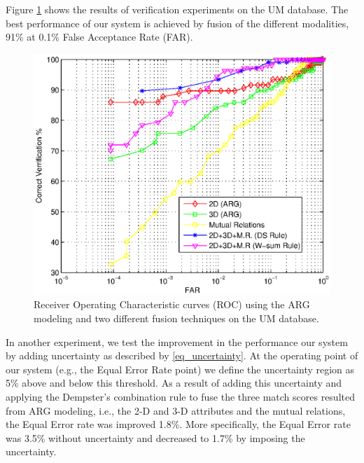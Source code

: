 {Figure \ref{fig_roc_UM} shows the results of verification
experiments on the UM database. The best performance of our system
is achieved by fusion of the different modalities, 91\% at 0.1\%
False Acceptance Rate (FAR).
\begin{figure}[tbp]
\begin{center}
\includegraphics[scale = .6]{./chapters/figures/roc_UM.eps}
\caption{Receiver Operating Characteristic curves (ROC) using the
ARG modeling and two different fusion techniques on the UM
database.}\label{fig_roc_UM}
\end{center}
\end{figure}

In another experiment, we test the improvement in the performance
our system by adding uncertainty as described by
\ref{eq_uncertainty}. At the operating point of our system (e.g.,
the Equal Error Rate point) we define the uncertainty region as 5\%
above and below this threshold. As a result of adding this
uncertainty and applying the Dempster's combination rule to fuse the
three match scores resulted from ARG modeling, i.e., the 2-D and 3-D
attributes and the mutual relations, the Equal Error rate was
improved 1.8\%. More specifically, the Equal Error rate was 3.5\%
without uncertainty and decreased to 1.7\% by imposing the
uncertainty.

}
